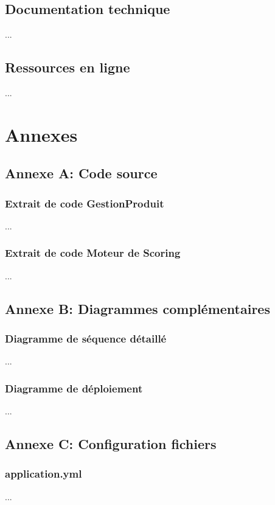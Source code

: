 \documentclass[12pt,a4paper]{report}
\begin{document}
\section{Documentation technique}
...

\section{Ressources en ligne}
...

\appendix
\chapter{Annexes}
\label{chap:annexes}

\section{Annexe A: Code source}
\subsection{Extrait de code GestionProduit}
...

\subsection{Extrait de code Moteur de Scoring}
...

\section{Annexe B: Diagrammes complémentaires}
\subsection{Diagramme de séquence détaillé}
...

\subsection{Diagramme de déploiement}
...

\section{Annexe C: Configuration fichiers}
\subsection{application.yml}
...
\end{document}

